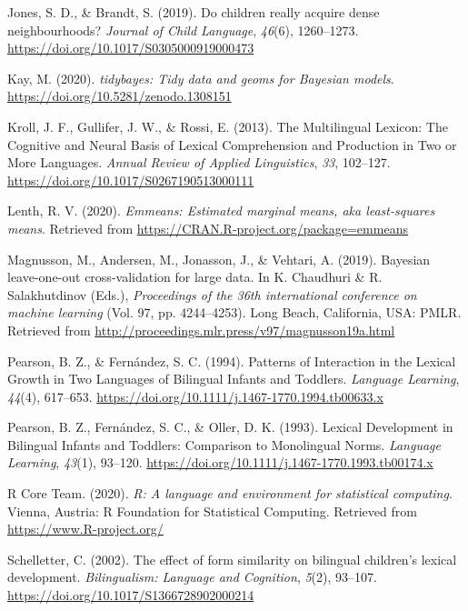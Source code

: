 \documentclass[
  english,
  man,man,floatsintext]{apa6}
\newlength{\cslhangindent}
\newenvironment{cslreferences}%
  {\setlength{\parindent}{0pt}%
  \everypar{\setlength{\hangindent}{\cslhangindent}}\ignorespaces}%
  {\par}
\begin{document}
\begin{cslreferences}
\leavevmode\hypertarget{ref-jones_children_2019}{}%
Jones, S. D., \& Brandt, S. (2019). Do children really acquire dense neighbourhoods? \emph{Journal of Child Language}, \emph{46}(6), 1260--1273. \url{https://doi.org/10.1017/S0305000919000473}

\leavevmode\hypertarget{ref-kay_tidybayes_2020}{}%
Kay, M. (2020). \emph{tidybayes: Tidy data and geoms for Bayesian models}. \url{https://doi.org/10.5281/zenodo.1308151}

\leavevmode\hypertarget{ref-kroll_multilingual_2013}{}%
Kroll, J. F., Gullifer, J. W., \& Rossi, E. (2013). The Multilingual Lexicon: The Cognitive and Neural Basis of Lexical Comprehension and Production in Two or More Languages. \emph{Annual Review of Applied Linguistics}, \emph{33}, 102--127. \url{https://doi.org/10.1017/S0267190513000111}

\leavevmode\hypertarget{ref-lenth_emmeans_2020}{}%
Lenth, R. V. (2020). \emph{Emmeans: Estimated marginal means, aka least-squares means}. Retrieved from \url{https://CRAN.R-project.org/package=emmeans}

\leavevmode\hypertarget{ref-magnusson_leave_2019}{}%
Magnusson, M., Andersen, M., Jonasson, J., \& Vehtari, A. (2019). Bayesian leave-one-out cross-validation for large data. In K. Chaudhuri \& R. Salakhutdinov (Eds.), \emph{Proceedings of the 36th international conference on machine learning} (Vol. 97, pp. 4244--4253). Long Beach, California, USA: PMLR. Retrieved from \url{http://proceedings.mlr.press/v97/magnusson19a.html}

\leavevmode\hypertarget{ref-pearson_patterns_1994}{}%
Pearson, B. Z., \& Fernández, S. C. (1994). Patterns of Interaction in the Lexical Growth in Two Languages of Bilingual Infants and Toddlers. \emph{Language Learning}, \emph{44}(4), 617--653. \url{https://doi.org/10.1111/j.1467-1770.1994.tb00633.x}

\leavevmode\hypertarget{ref-pearson_lexical_1993}{}%
Pearson, B. Z., Fernández, S. C., \& Oller, D. K. (1993). Lexical Development in Bilingual Infants and Toddlers: Comparison to Monolingual Norms. \emph{Language Learning}, \emph{43}(1), 93--120. \url{https://doi.org/10.1111/j.1467-1770.1993.tb00174.x}

\leavevmode\hypertarget{ref-rcoreteam_r_2020}{}%
R Core Team. (2020). \emph{R: A language and environment for statistical computing}. Vienna, Austria: R Foundation for Statistical Computing. Retrieved from \url{https://www.R-project.org/}

\leavevmode\hypertarget{ref-schelletter_effect_2002}{}%
Schelletter, C. (2002). The effect of form similarity on bilingual children's lexical development. \emph{Bilingualism: Language and Cognition}, \emph{5}(2), 93--107. \url{https://doi.org/10.1017/S1366728902000214}


\end{cslreferences}
\end{document}
